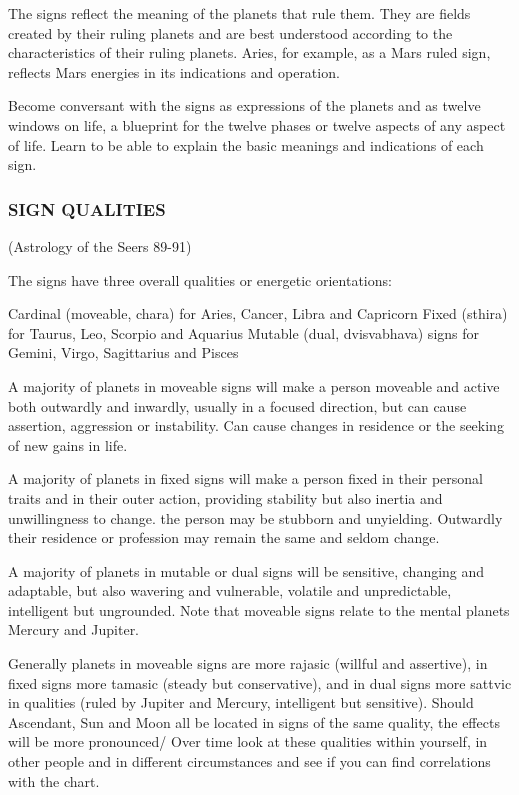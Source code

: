 The signs reflect the meaning of the planets that rule them. They are fields created by their ruling planets and are best understood according to the characteristics of their ruling planets. Aries, for example, as a Mars ruled sign, reflects Mars energies in its indications and operation.

Become conversant with the signs as expressions of the planets and as twelve windows on life, a blueprint for the twelve phases or twelve aspects of any aspect of life. Learn to be able to explain the basic meanings and indications of each sign.

 

\subsubsection{SIGN QUALITIES }(Astrology of the Seers 89-91)

 

The signs have three overall qualities or energetic orientations:

 

Cardinal (moveable, chara) for Aries, Cancer, Libra and Capricorn
Fixed (sthira) for Taurus, Leo, Scorpio and Aquarius
Mutable (dual, dvisvabhava) signs for Gemini, Virgo, Sagittarius and Pisces
 

A majority of planets in moveable signs will make a person moveable and active both outwardly and inwardly, usually in a focused direction, but can cause assertion, aggression or instability. Can cause changes in residence or the seeking of new gains in life.

A majority of planets in fixed signs will make a person fixed in their personal traits and in their outer action, providing stability but also inertia and unwillingness to change. the person may be stubborn and unyielding. Outwardly their residence or profession may remain the same and seldom change.

A majority of planets in mutable or dual signs will be sensitive, changing and adaptable, but also wavering and vulnerable, volatile and unpredictable, intelligent but ungrounded. Note that moveable signs relate to the mental planets Mercury and Jupiter.

 

Generally planets in moveable signs are more rajasic (willful and assertive), in fixed signs more tamasic (steady but conservative), and in dual signs more sattvic in qualities (ruled by Jupiter and Mercury, intelligent but sensitive). Should Ascendant, Sun and Moon all be located in signs of the same quality, the effects will be more pronounced/ Over time look at these qualities within yourself, in other people and in different circumstances and see if you can find  correlations with the chart.

